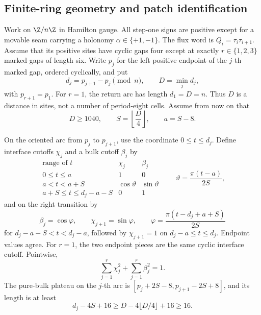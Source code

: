 \subsection{Finite-ring geometry and patch identification}

Work on \(\Z/n\Z\) in Hamilton gauge.  All step-one signs are positive
except for a movable seam carrying a holonomy
\(\alpha\in\{+1,-1\}\).  The flux word is
\(Q_i=\tau_i\tau_{i+1}\).  Assume that its positive sites have cyclic gaps
four except at exactly \(r\in\{1,2,3\}\) marked gaps of length six.  Write
\(p_j\) for the left positive endpoint of the \(j\)-th marked gap, ordered
cyclically, and put
\begin{equation}
 d_j=p_{j+1}-p_j\pmod n,\qquad D=\min_j d_j,
 \label{eq:separation}
\end{equation}
with \(p_{r+1}=p_1\).  For \(r=1\), the return arc has length \(d_1=D=n\).
Thus \(D\) is a distance in sites, not a number of period-eight cells.
Assume from now on that
\begin{equation}
 D\geq1040,\qquad S=\left\lfloor\frac D4\right\rfloor,
 \qquad a=S-8.
 \label{eq:S}
\end{equation}

On the oriented arc from \(p_j\) to \(p_{j+1}\), use the coordinate
\(0\leq t\leq d_j\).  Define interface cutoffs \(\chi_j\) and a bulk cutoff
\(\beta_j\) by
\begin{equation}
\begin{array}{c|cc}
\text{range of }t&\chi_j&\beta_j\\ \hline
0\leq t\leq a&1&0\\
a<t<a+S&\cos\vartheta&\sin\vartheta\\
a+S\leq t\leq d_j-a-S&0&1
\end{array}
\qquad
 \vartheta=\frac{\pi(t-a)}{2S},
 \label{eq:left-cutoff}
\end{equation}
and on the right transition by
\begin{equation}
 \beta_j=\cos\varphi,\qquad \chi_{j+1}=\sin\varphi,\qquad
 \varphi=\frac{\pi(t-d_j+a+S)}{2S}
 \label{eq:right-cutoff}
\end{equation}
for \(d_j-a-S<t<d_j-a\), followed by \(\chi_{j+1}=1\) on
\(d_j-a\leq t\leq d_j\).  Endpoint values agree.  For \(r=1\), the two
endpoint pieces are the same cyclic interface cutoff.  Pointwise,
\begin{equation}
 \sum_{j=1}^r\chi_j^2+\sum_{j=1}^r\beta_j^2=1.
 \label{eq:partition}
\end{equation}
The pure-bulk plateau on the \(j\)-th arc is
\([p_j+2S-8,p_{j+1}-2S+8]\), and its length is at least
\begin{equation}
 d_j-4S+16\geq D-4\lfloor D/4\rfloor+16\geq16.
 \label{eq:bulk-plateau}
\end{equation}

